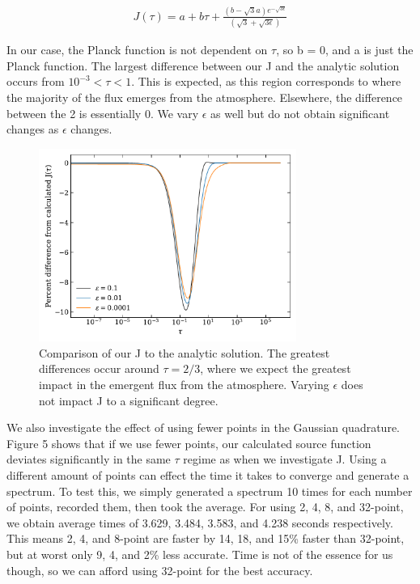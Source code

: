 \documentclass[12pt]{article}
\begin{document}
\begin{equation}
\begin{split}
   J(\tau) = a + b\tau + \frac{(b - \sqrt{3}a)e^{-\sqrt{3\epsilon}}}{(\sqrt{3}+\sqrt{3\epsilon})}
\end{split}
\end{equation}

In our case, the Planck function is not dependent on $\tau$, so b = 0, and a is just the Planck function. 
The largest difference between our J and the analytic solution occurs from $10^{-3} < \tau < 1$. This is expected, as this region corresponds to where the majority of the flux emerges from the atmosphere. Elsewhere, the difference between the 2 is essentially 0. We vary $\epsilon$ as well but do not obtain significant changes as $\epsilon$ changes.


\begin{figure}[ht]
 \centering
 \includegraphics[width=0.75\textwidth]{J_comparison.pdf}
 \caption{Comparison of our J to the analytic solution. The greatest differences occur around $\tau = 2/3$, where we expect the greatest impact in the emergent flux from the atmosphere. Varying $\epsilon$ does not impact J to a significant degree.}
\end{figure}

We also investigate the effect of using fewer points in the Gaussian quadrature. Figure 5 shows that if we use fewer points, our calculated source function deviates significantly in the same $\tau$ regime as when we investigate J. 
Using a different amount of points can effect the time it takes to converge and generate a spectrum. To test this, we simply generated a spectrum 10 times for each number of points, recorded them, then took the average. For using 2, 4, 8, and 32-point, we obtain average times of 3.629, 3.484, 3.583, and 4.238 seconds respectively. This means 2, 4, and 8-point are faster by 14, 18, and 15\% faster than 32-point, but at worst only 9, 4, and 2\% less accurate. Time is not of the essence for us though, so we can afford using 32-point for the best accuracy.
\end{document}

